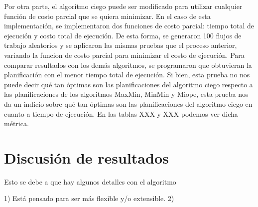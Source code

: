 Por otra parte, el algoritmo ciego puede ser modificado para utilizar cualquier función de costo parcial que se quiera minimizar. En el caso de esta implementación, se implementaron dos funciones de costo parcial: tiempo total de ejecución y costo total de ejecución. De esta forma, se generaron 100 flujos de trabajo aleatorios y se aplicaron las mismas pruebas que el proceso anterior, variando la funcion de costo parcial para minimizar el costo de ejecución. Para comparar resultados con los demás algoritmos, se programaron que obtuvieran la planificación con el menor tiempo total de ejecución. Si bien, esta prueba no nos puede decir qué tan óptimas son las planificaciones del algoritmo ciego respecto a las planificaciones de los algoritmos MaxMin, MinMin y Miope, esta prueba nos da un indicio sobre qué tan óptimas son las planificaciones del algoritmo ciego en cuanto a tiempo de ejecución. En las tablas XXX y XXX podemos ver dicha métrica. 




\section{Discusión de resultados}

Esto se debe a que hay algunos detalles con el algoritmo

1) Está pensado para ser más flexible y/o extensible.
2)
